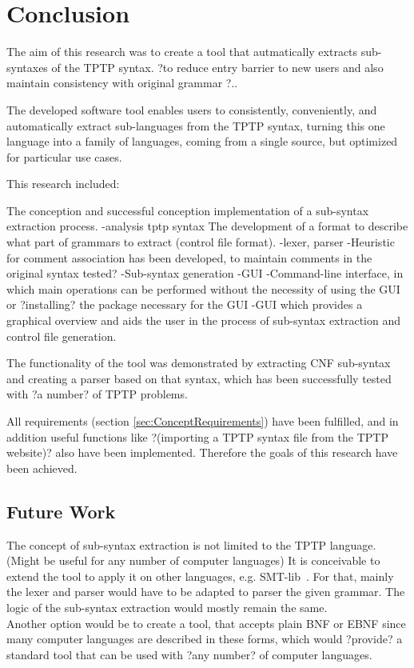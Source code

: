 
\chapter{Conclusion}\label{cha:Conclusion}

The aim of this research was to create a tool that autmatically extracts sub-syntaxes of the \ac{TPTP} syntax. ?to reduce entry barrier to new users and also maintain consistency with original grammar  ?..

The developed software tool enables users to consistently, conveniently, and automatically extract sub-languages from the \ac{TPTP} syntax, turning this one language into a family of languages, coming from a single source, but optimized for particular use cases.

This research included:

The conception and successful conception implementation of a sub-syntax extraction process.
-analysis tptp syntax
The development of a format to describe what part of grammars to extract (control file format).
-lexer, parser
-Heuristic for comment association has been developed, to maintain comments in the original syntax tested?
-Sub-syntax generation
-GUI
-Command-line interface, in which main operations can be performed without the necessity of using the GUI or ?installing? the package necessary for the GUI
-GUI which provides a graphical overview and aids the user in the process of sub-syntax extraction and control file generation.

The functionality of the tool was demonstrated by extracting \ac{CNF} sub-syntax and creating a parser based on that syntax, which has been successfully tested with ?a number? of \ac{TPTP} problems.

All requirements (section \ref{sec:ConceptRequirements}) have been fulfilled, and in addition useful functions like ?(importing a \ac{TPTP} syntax file from the \ac{TPTP} website)? also have been implemented. Therefore the goals of this research have been achieved.
\section{Future Work}\label{sec:FutureWork}
The concept of sub-syntax extraction is not limited to the \ac{TPTP} language. (Might be useful for any number of computer languages)
It is conceivable to extend the tool to apply it on other languages, e.g. SMT-lib~\cite{BFT-SMTLIB-17}. For that, mainly the lexer and parser would have to be adapted to parser the given grammar. The logic of the sub-syntax extraction would mostly remain the same.\\
Another option would be to create a tool, that accepts plain \ac{BNF} or \ac{EBNF} since many computer languages are described in these forms, which would ?provide? a standard tool that can be used with ?any number? of computer languages.

